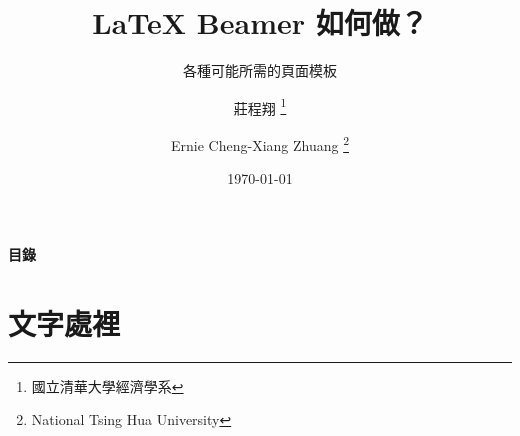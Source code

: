 \documentclass[12pt, aspectratio=169]{beamer}
\begin{document}


\title[\LaTeX{}  Beamer 如何做？]{\Huge{\textbf{\LaTeX{} Beamer 如何做？}}} 

\subtitle{各種可能所需的頁面模板} 

\author[Ernie Cheng-Xiang Zhuang]{%
莊程翔  \thanks{國立清華大學經濟學系} \and%
Ernie Cheng-Xiang Zhuang \thanks{National Tsing Hua University}
}


\date[\today]{\today}


\begin{frame}
	\titlepage %
\end{frame}


\begin{frame}{\textbf{目錄}}
	\tableofcontents %
\end{frame}




\section{文字處裡}
\end{document}
